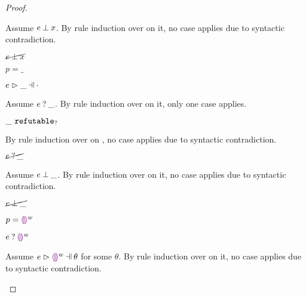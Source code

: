 \begin{proof}
\begin{byCases}
    Assume $e \mathbin{\bot} x$. By rule induction over  on it, no case applies due to syntactic contradiction.
    \begin{pfsteps*}
    \item $\cancel{e \mathbin{\bot} x}$ 
    \end{pfsteps*}
\item[\text{(\ref{rule:PTWild})}]
    \begin{pfsteps*}
    \item $p=\_$ 
    \item $\hpatmatch{e}{\_}{\cdot}$ 
    \end{pfsteps*}
    Assume $e \mathbin{?} \_$. By rule induction over  on it, only one case applies.
    \begin{byCases}
    \item[\text{(\ref{rule:MMNotIntro})}]
        \begin{pfsteps*}
        \item $\_ ~\mathtt{refutable}_?$  
        \end{pfsteps*}
        By rule induction over  on , no case applies due to syntactic contradiction.
    \end{byCases}
    \begin{pfsteps*}
    \item $\cancel{e \mathbin{?} \_}$ 
    \end{pfsteps*}
    Assume $e \mathbin{\bot} \_$. By rule induction over  on it, no case applies due to syntactic contradiction.
    \begin{pfsteps*}
    \item $\cancel{e \mathbin{\bot} \_}$ 
    \end{pfsteps*}
\item[\text{(\ref{rule:PTEHole})}]
    \begin{pfsteps*}
    \item $p=\textcolor{violet}{\llparenthesis}\textcolor{violet}{\rrparenthesis}^{w}$ 
    \item $e \mathbin{?} \textcolor{violet}{\llparenthesis}\textcolor{violet}{\rrparenthesis}^{w}$ 
    \end{pfsteps*}
    Assume $\hpatmatch{e}{\hehole{w}}{\theta}$ for some $\theta$. By rule induction over  on it, no case applies due to syntactic contradiction.
    \begin{pfsteps*}

\end{pfsteps*}
\end{byCases}
\end{proof}
